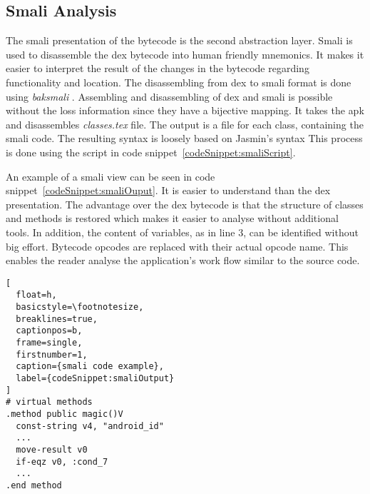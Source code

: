 \subsection{Smali Analysis} \label{subsection:tools-baksmali}
The smali presentation of the bytecode is the second abstraction layer.
Smali is used to disassemble the dex bytecode into human friendly mnemonics.
It makes it easier to interpret the result of the changes in the bytecode regarding functionality and location.
\newline
The disassembling from dex to smali format is done using \textit{baksmali} \cite{smali}.
Assembling and disassembling of dex and smali is possible without the loss information since they have a bijective mapping\cite{smali}.
It takes the \gls{apk} and disassembles \textit{classes.tex} file.
The output is a file for each class, containing the smali code.
The resulting syntax is loosely based on Jasmin's syntax
This process is done using the script in code snippet~\ref{codeSnippet:smaliScript}.
\newline

An example of a smali view can be seen in code snippet~\ref{codeSnippet:smaliOuput}.
It is easier to understand than the dex presentation.
The advantage over the dex bytecode is that the structure of classes and methods is restored which makes it easier to analyse without additional tools.
In addition, the content of variables, as in line 3, can be identified without big effort.
Bytecode opcodes are replaced with their actual opcode name.
This enables the reader analyse the application's work flow similar to the source code.
\newline
\begin{lstlisting}[
  float=h,
  basicstyle=\footnotesize,
  breaklines=true,
  captionpos=b,
  frame=single,
  firstnumber=1,
  caption={smali code example},
  label={codeSnippet:smaliOutput}
]
# virtual methods
.method public magic()V
  const-string v4, "android_id"
  ...
  move-result v0
  if-eqz v0, :cond_7
  ...
.end method
\end{lstlisting}

